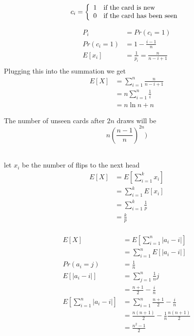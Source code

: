 \documentclass[11pt]{article}
\begin{document}
	$$
	c_i = \left\{
			\begin{array}{ll}
				 1 & \mbox{if the card is new}\\
				 0 & \mbox{if the card has been seen} 
			\end{array}
		\right.
		\\
	$$

	\begin{align*}
		P_i &= Pr(c_i=1)\\
		Pr(c_i=1) &= 1 - \frac{i-1}{n}\\
		E[x_i] &= \frac{1}{p_i}=\frac{n}{n-i+1}\\
	\end{align*}
	Plugging this into the summation we get
	\begin{align*}
		E[X] &= \sum\limits_{i=1}^n \frac{n}{n-i+1}\\
			 &= n\sum\limits_{i=1}^n \frac{1}{i}\\
			 &= n \ln n + n
	\end{align*}
	
	
	The number of unseen cards after $2n$ draws will be
	$$
	n(\frac{n-1}{n})^{2n})
	$$

	\newpage
	\bigskip
	\\
	let $x_i$ be the number of flips to the next head
	\begin{align*}
		E[X] &= E[\sum\limits_{i=1}^k x_i]\\
			 &= \sum\limits_{i=1}^k E[x_i]\\
			 &= \sum\limits_{i=1}^k \frac{1}{p}\\
			 &= \frac{k}{p}
	\end{align*}
	\bigskip
	\\
	\begin{align*}
		E[X] &= E[\sum\limits_{i=1}^{n}|a_i-i|]\\
			 &= \sum\limits_{i=1}^{n}E[|a_i-i|]\\
		Pr(a_i=j)&=\frac{1}{n}\\
		E[|a_i -i|] &= \sum\limits_{j=1}^n \frac{1}{n}j\\
		&= \frac{n+1}{2} - \frac{i}{n}\\
		E[\sum\limits_{i=1}^{n}|a_i-i|]&=\sum\limits_{i=1}^{n}\frac{n+1}{2} - \frac{i}{n}\\
		&=\frac{n(n+1)}{2} - \frac{1}{n}\frac{n(n+1)}{2}\\
		&=\frac{n^2-1}{2}		
	\end{align*}
\end{document}
